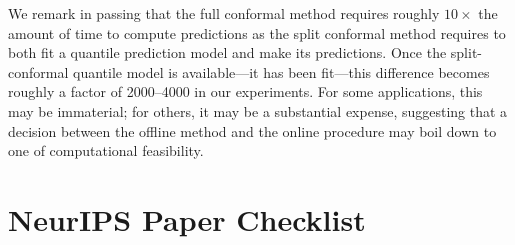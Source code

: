 \documentclass{article}
\begin{document}
We remark in passing that the full conformal method requires roughly $10
\times$ the amount of time to compute predictions as the split conformal
method requires to both fit a quantile prediction model and make its
predictions.
%
Once the split-conformal quantile model is available---it has been
fit---this difference becomes roughly a factor
of 2000--4000 in our experiments.
%
For some applications, this may be immaterial; for others, it may be
a substantial expense, suggesting that a decision between
the offline method and the online procedure may boil down to
one of computational feasibility.

\newpage

\section*{NeurIPS Paper Checklist}
\end{document}
